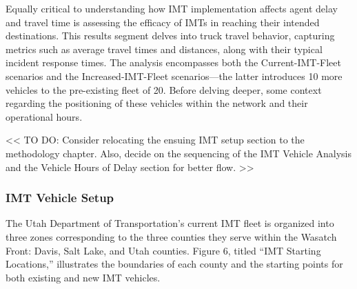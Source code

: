 \documentclass[
  letterpaper,
  authoryear]{elsarticle}
\begin{document}
Equally critical to understanding how IMT implementation affects agent
delay and travel time is assessing the efficacy of IMTs in reaching
their intended destinations. This results segment delves into truck
travel behavior, capturing metrics such as average travel times and
distances, along with their typical incident response times. The
analysis encompasses both the Current-IMT-Fleet scenarios and the
Increased-IMT-Fleet scenarios---the latter introduces 10 more vehicles
to the pre-existing fleet of 20. Before delving deeper, some context
regarding the positioning of these vehicles within the network and their
operational hours.

\textless\textless{} TO DO: Consider relocating the ensuing IMT setup
section to the methodology chapter. Also, decide on the sequencing of
the IMT Vehicle Analysis and the Vehicle Hours of Delay section for
better flow. \textgreater\textgreater{}

\hypertarget{imt-vehicle-setup}{%
\subsubsection{IMT Vehicle Setup}\label{imt-vehicle-setup}}

The Utah Department of Transportation's current IMT fleet is organized
into three zones corresponding to the three counties they serve within
the Wasatch Front: Davis, Salt Lake, and Utah counties. Figure 6, titled
``IMT Starting Locations,'' illustrates the boundaries of each county
and the starting points for both existing and new IMT vehicles.
\end{document}
